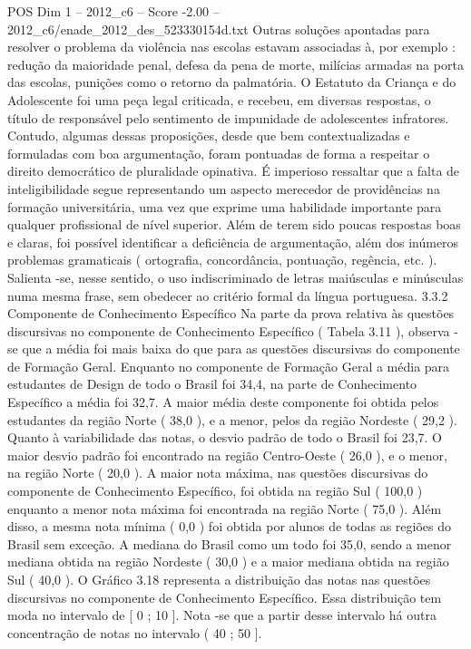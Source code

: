 \begin{textsample}{POS Dim 1 – 2012\_c6 – Score -2.00 – 2012\_c6/enade\_2012\_des\_523330154d.txt}
Outras soluções apontadas para resolver o problema da violência nas escolas estavam associadas à, por exemplo : redução da maioridade penal, defesa da pena de morte, milícias armadas na porta das escolas, punições como o retorno da palmatória.
O Estatuto da Criança e do Adolescente foi uma peça legal criticada, e recebeu, em diversas respostas, o título de responsável pelo sentimento de impunidade de adolescentes infratores.
Contudo, algumas dessas proposições, desde que bem contextualizadas e formuladas com boa argumentação, foram pontuadas de forma a respeitar o direito democrático de pluralidade opinativa.
É imperioso ressaltar que a falta de inteligibilidade segue representando um aspecto merecedor de providências na formação universitária, uma vez que exprime uma habilidade importante para qualquer profissional de nível superior.
Além de terem sido poucas respostas boas e claras, foi possível identificar a deficiência de argumentação, além dos inúmeros problemas gramaticais ( ortografia, concordância, pontuação, regência, etc. ).
Salienta -se, nesse sentido, o uso indiscriminado de letras maiúsculas e minúsculas numa mesma frase, sem obedecer ao critério formal da língua portuguesa. 3.3.2 Componente de Conhecimento Específico Na parte da prova relativa às questões discursivas no componente de Conhecimento Específico ( Tabela 3.11 ), observa -se que a média foi mais baixa do que para as questões discursivas do componente de Formação Geral.
Enquanto no componente de Formação Geral a média para estudantes de Design de todo o Brasil foi 34,4, na parte de Conhecimento Específico a média foi 32,7.
A maior média deste componente foi obtida pelos estudantes da região Norte ( 38,0 ), e a menor, pelos da região Nordeste ( 29,2 ).
Quanto à variabilidade das notas, o desvio padrão de todo o Brasil foi 23,7.
O maior desvio padrão foi encontrado na região Centro-Oeste ( 26,0 ), e o menor, na região Norte ( 20,0 ).
A maior nota máxima, nas questões discursivas do componente de Conhecimento Específico, foi obtida na região Sul ( 100,0 ) enquanto a menor nota máxima foi encontrada na região Norte ( 75,0 ).
Além disso, a mesma nota mínima ( 0,0 ) foi obtida por alunos de todas as regiões do Brasil sem exceção.
A mediana do Brasil como um todo foi 35,0, sendo a menor mediana obtida na região Nordeste ( 30,0 ) e a maior mediana obtida na região Sul ( 40,0 ).
O Gráfico 3.18 representa a distribuição das notas nas questões discursivas no componente de Conhecimento Específico.
Essa distribuição tem moda no intervalo de [ 0 ; 10 ].
Nota -se que a partir desse intervalo há outra concentração de notas no intervalo ( 40 ; 50 ].

\end{textsample}
